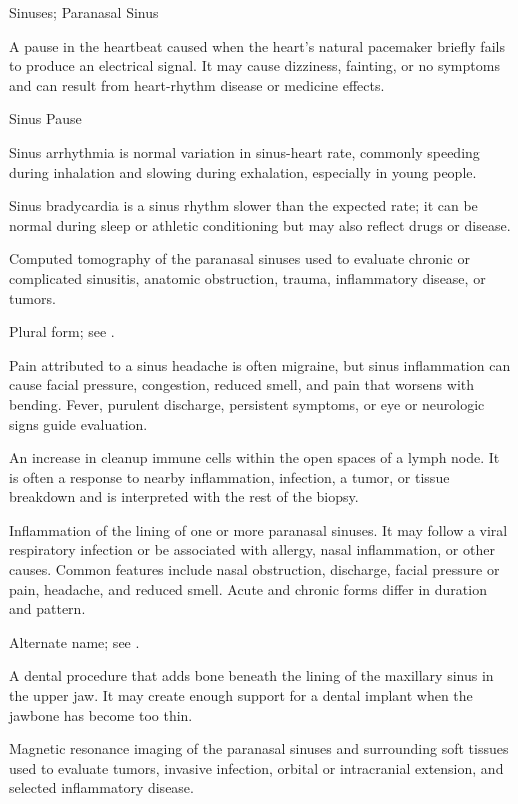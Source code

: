 \synonyms
Sinuses; Paranasal Sinus

 A pause in the heartbeat caused when the heart’s natural pacemaker briefly fails to produce an electrical signal. It may cause dizziness, fainting, or no symptoms and can result from heart-rhythm disease or medicine effects.

\synonyms
Sinus Pause

 Sinus arrhythmia is normal variation in sinus-heart rate, commonly speeding during inhalation and slowing during exhalation, especially in young people.

 Sinus bradycardia is a sinus rhythm slower than the expected rate; it can be normal during sleep or athletic conditioning but may also reflect drugs or disease.

 Computed tomography of the paranasal sinuses used to evaluate chronic or complicated sinusitis, anatomic obstruction, trauma, inflammatory disease, or tumors.

 Plural form; see .

 Pain attributed to a sinus headache is often migraine, but sinus inflammation can cause facial pressure, congestion, reduced smell, and pain that worsens with bending. Fever, purulent discharge, persistent symptoms, or eye or neurologic signs guide evaluation.

 An increase in cleanup immune cells within the open spaces of a lymph node. It is often a response to nearby inflammation, infection, a tumor, or tissue breakdown and is interpreted with the rest of the biopsy.

 Inflammation of the lining of one or more paranasal sinuses. It may follow a viral respiratory infection or be associated with allergy, nasal inflammation, or other causes. Common features include nasal obstruction, discharge, facial pressure or pain, headache, and reduced smell. Acute and chronic forms differ in duration and pattern.

 Alternate name; see .

 A dental procedure that adds bone beneath the lining of the maxillary sinus in the upper jaw. It may create enough support for a dental implant when the jawbone has become too thin.

 Magnetic resonance imaging of the paranasal sinuses and surrounding soft tissues used to evaluate tumors, invasive infection, orbital or intracranial extension, and selected inflammatory disease.

